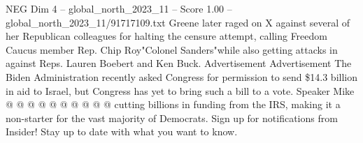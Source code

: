\begin{textsample}{NEG Dim 4 – global\_north\_2023\_11 – Score 1.00 – global\_north\_2023\_11/91717109.txt}
Greene later raged on X against several of her Republican colleagues for halting the censure attempt, calling Freedom Caucus member Rep.
Chip Roy"Colonel Sanders"while also getting attacks in against Reps.
Lauren Boebert and Ken Buck.
Advertisement Advertisement The Biden Administration recently asked Congress for permission to send \$14.3 billion in aid to Israel, but Congress has yet to bring such a bill to a vote.
Speaker Mike @ @ @ @ @ @ @ @ @ @ cutting billions in funding from the IRS, making it a non-starter for the vast majority of Democrats.
Sign up for notifications from Insider!
Stay up to date with what you want to know.

\end{textsample}
